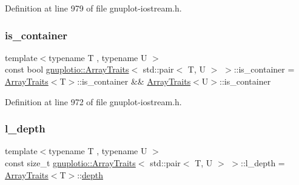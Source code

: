 Definition at line 979 of file gnuplot-\/iostream.\+h.

\mbox{\label{classgnuplotio_1_1_array_traits_3_01std_1_1pair_3_01_t_00_01_u_01_4_01_4_a8656ab8094037d88b470f718ff7197e0}} 
\subsubsection{\texorpdfstring{is\+\_\+container}{is\_container}}
{\footnotesize\ttfamily template$<$typename T , typename U $>$ \\
const bool \hyperlink{classgnuplotio_1_1_array_traits}{gnuplotio\+::\+Array\+Traits}$<$ std\+::pair$<$ T, U $>$ $>$\+::is\+\_\+container = \hyperlink{classgnuplotio_1_1_array_traits}{Array\+Traits}$<$T$>$\+::is\+\_\+container \&\& \hyperlink{classgnuplotio_1_1_array_traits}{Array\+Traits}$<$U$>$\+::is\+\_\+container\hspace{0.3cm}{\ttfamily [static]}}



Definition at line 972 of file gnuplot-\/iostream.\+h.

\mbox{\label{classgnuplotio_1_1_array_traits_3_01std_1_1pair_3_01_t_00_01_u_01_4_01_4_ae8be9661c88a8970da3d87c1afc063dc}} 
\subsubsection{\texorpdfstring{l\+\_\+depth}{l\_depth}}
{\footnotesize\ttfamily template$<$typename T , typename U $>$ \\
const size\+\_\+t \hyperlink{classgnuplotio_1_1_array_traits}{gnuplotio\+::\+Array\+Traits}$<$ std\+::pair$<$ T, U $>$ $>$\+::l\+\_\+depth = \hyperlink{classgnuplotio_1_1_array_traits}{Array\+Traits}$<$T$>$\+::\hyperlink{classgnuplotio_1_1_array_traits_3_01std_1_1pair_3_01_t_00_01_u_01_4_01_4_a11b3be89ac9506fcfcceb318acc7e2bf}{depth}\hspace{0.3cm}{\ttfamily [static]}}



